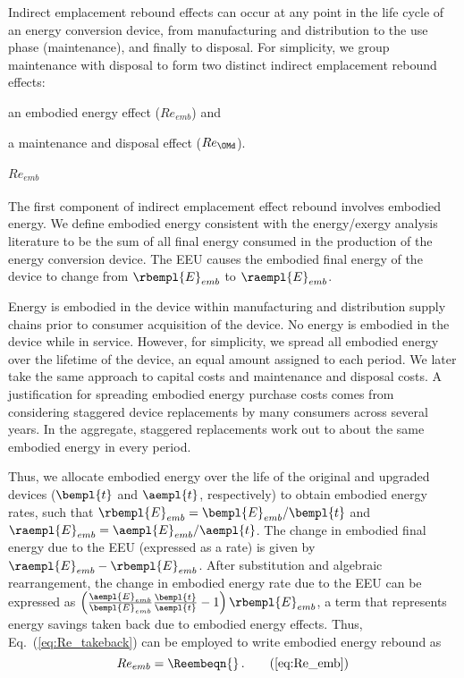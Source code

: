 Indirect emplacement rebound effects 
can occur at any point in the life cycle of an energy conversion device,
from manufacturing and distribution 
to the use phase (maintenance),
and finally to disposal.
For simplicity, we group maintenance with disposal to form
two distinct indirect emplacement rebound effects:
%
\begin{enumerate*}[label={(\alph*)}]
	
  \item an embodied energy effect ($Re_{emb}$) and 
  
  \item a maintenance and disposal effect ($Re_{\OMd}$).
    
\end{enumerate*}


\paragraph{$Re_{emb}$}
\label{sec:Re_emb}

The first component of indirect emplacement effect rebound
involves embodied energy.
We define embodied energy consistent with the energy/exergy analysis literature
to be the sum of all final energy consumed
in the production of the energy conversion device.
The EEU
causes the embodied final energy of the device to change
from $\rbempl{E}_{emb}$ to $\raempl{E}_{emb}$.

Energy is embodied in the device within manufacturing and distribution supply chains
prior to consumer acquisition of the device.
No energy is embodied in the device while in service.
However, for simplicity, we spread all embodied energy
over the lifetime of the device,
an equal amount assigned to each period.
We later take the same approach to capital costs and
maintenance and disposal costs.
A justification for spreading embodied energy purchase costs comes from considering
staggered device replacements by many consumers across several years.
In the aggregate, staggered replacements
work out to about the same embodied energy in every period.

Thus, we allocate embodied energy over the life of the original and upgraded devices
($\bempl{t}$ and $\aempl{t}$, respectively)
to obtain embodied energy rates, such that
$\rbempl{E}_{emb} = \bempl{E}_{emb} / \bempl{t}$
and 
$\raempl{E}_{emb} = \aempl{E}_{emb} / \aempl{t}$.
The change in embodied final energy due to the EEU (expressed as a rate) is given by
$\raempl{E}_{emb} - \rbempl{E}_{emb}$.
After substitution and algebraic rearrangement,
the change in embodied energy rate due to the EEU can be expressed as
$\left( \frac{\aempl{E}_{emb}}{\bempl{E}_{emb}}
  \frac{\bempl{t}}{\aempl{t}} - 1 \right) \rbempl{E}_{emb}$, 
a term that represents energy savings taken back due to embodied energy effects.
Thus, Eq.~(\ref{eq:Re_takeback}) can be employed to write embodied energy rebound as
%
\begin{equation} 
  Re_{emb} = \Reembeqn{} \, . \tag{\ref{eq:Re_emb}}
\end{equation}


